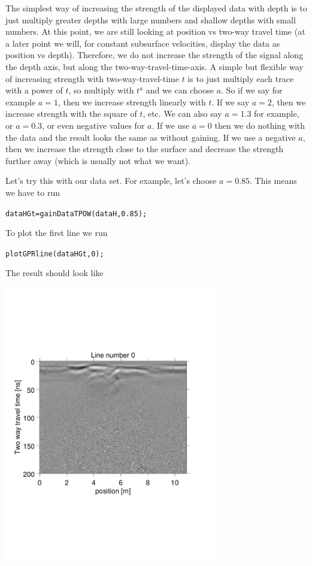 \documentclass[11pt]{article}
\begin{document}
The simplest way of increasing the strength of the displayed data with
depth is to just multiply greater depths with large numbers and
shallow depths with small numbers. At this point, we are still looking
at position vs two-way travel time (at a later point we will, for
constant subsurface velocities, display the data as position vs
depth). Therefore, we do not increase the strength of the signal along
the depth axis, but along the two-way-travel-time-axis. A simple but
flexible way of increasing strength with two-way-travel-time $t$ is to
just multiply each trace with a power of $t$, so multiply with $t^a$
and we can choose $a$. So if we say for example $a=1$, then we
increase strength linearly with $t$. If we say $a=2$, then we increase
strength with the square of $t$, etc. We can also say $a=1.3$ for
example, or $a=0.3$, or even negative values for $a$. If we use $a=0$
then we do nothing with the data and the result looks the same as
without gaining. If we use a negative $a$, then we increase the strength
close to the surface and decrease the strength further away (which is
usually not what we want).

Let's try this with our data set. For example, let's choose
$a=0.85$. This means we have to run

\qquad \verb#dataHGt=gainDataTPOW(dataH,0.85);#

To plot the first line we run

\qquad \verb#plotGPRline(dataHGt,0);#

The result should look like

\begin{center}
\includegraphics[width=0.7\textwidth, trim = 0.9cm 6cm 2cm
  6.5cm,clip]{figures/GPRlineHGt0}
\end{center}
\end{document}
